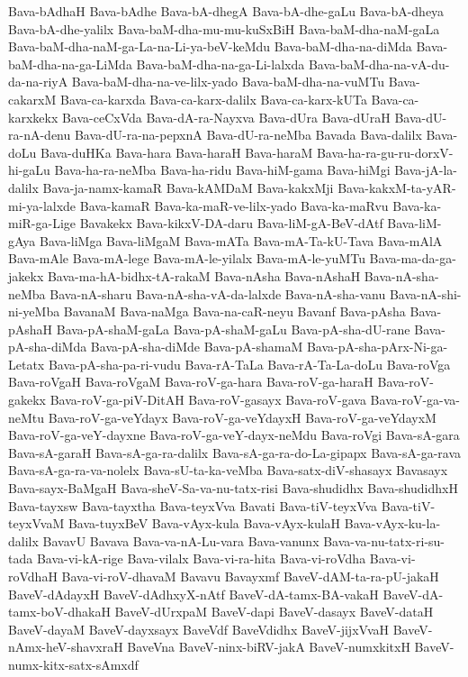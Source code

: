 {Bava-bAdhaH
Bava-bAdhe
Bava-bA-dhegA
Bava-bA-dhe-gaLu
Bava-bA-dheya
Bava-bA-dhe-yalilx
Bava-baM-dha-mu-mu-kuSxBiH
Bava-baM-dha-naM-gaLa
Bava-baM-dha-naM-ga-La-na-Li-ya-beV-keMdu
Bava-baM-dha-na-diMda
Bava-baM-dha-na-ga-LiMda
Bava-baM-dha-na-ga-Li-lalxda
Bava-baM-dha-na-vA-du-da-na-riyA
Bava-baM-dha-na-ve-lilx-yado
Bava-baM-dha-na-vuMTu
Bava-cakarxM
Bava-ca-karxda
Bava-ca-karx-dalilx
Bava-ca-karx-kUTa
Bava-ca-karxkekx
Bava-ceCxVda
Bava-dA-ra-Nayxva
Bava-dUra
Bava-dUraH
Bava-dU-ra-nA-denu
Bava-dU-ra-na-pepxnA
Bava-dU-ra-neMba
Bavada
Bava-dalilx
Bava-doLu
Bava-duHKa
Bava-hara
Bava-haraH
Bava-haraM
Bava-ha-ra-gu-ru-dorxV-hi-gaLu
Bava-ha-ra-neMba
Bava-ha-ridu
Bava-hiM-gama
Bava-hiMgi
Bava-jA-la-dalilx
Bava-ja-namx-kamaR
Bava-kAMDaM
Bava-kakxMji
Bava-kakxM-ta-yAR-mi-ya-lalxde
Bava-kamaR
Bava-ka-maR-ve-lilx-yado
Bava-ka-maRvu
Bava-ka-miR-ga-Lige
Bavakekx
Bava-kikxV-DA-daru
Bava-liM-gA-BeV-dAtf
Bava-liM-gAya
Bava-liMga
Bava-liMgaM
Bava-mATa
Bava-mA-Ta-kU-Tava
Bava-mAlA
Bava-mAle
Bava-mA-lege
Bava-mA-le-yilalx
Bava-mA-le-yuMTu
Bava-ma-da-ga-jakekx
Bava-ma-hA-bidhx-tA-rakaM
Bava-nAsha
Bava-nAshaH
Bava-nA-sha-neMba
Bava-nA-sharu
Bava-nA-sha-vA-da-lalxde
Bava-nA-sha-vanu
Bava-nA-shi-ni-yeMba
BavanaM
Bava-naMga
Bava-na-caR-neyu
Bavanf
Bava-pAsha
Bava-pAshaH
Bava-pA-shaM-gaLa
Bava-pA-shaM-gaLu
Bava-pA-sha-dU-rane
Bava-pA-sha-diMda
Bava-pA-sha-diMde
Bava-pA-shamaM
Bava-pA-sha-pArx-Ni-ga-Letatx
Bava-pA-sha-pa-ri-vudu
Bava-rA-TaLa
Bava-rA-Ta-La-doLu
Bava-roVga
Bava-roVgaH
Bava-roVgaM
Bava-roV-ga-hara
Bava-roV-ga-haraH
Bava-roV-gakekx
Bava-roV-ga-piV-DitAH
Bava-roV-gasayx
Bava-roV-gava
Bava-roV-ga-va-neMtu
Bava-roV-ga-veYdayx
Bava-roV-ga-veYdayxH
Bava-roV-ga-veYdayxM
Bava-roV-ga-veY-dayxne
Bava-roV-ga-veY-dayx-neMdu
Bava-roVgi
Bava-sA-gara
Bava-sA-garaH
Bava-sA-ga-ra-dalilx
Bava-sA-ga-ra-do-La-gipapx
Bava-sA-ga-rava
Bava-sA-ga-ra-va-nolelx
Bava-sU-ta-ka-veMba
Bava-satx-diV-shasayx
Bavasayx
Bava-sayx-BaMgaH
Bava-sheV-Sa-va-nu-tatx-risi
Bava-shudidhx
Bava-shudidhxH
Bava-tayxsw
Bava-tayxtha
Bava-teyxVva
Bavati
Bava-tiV-teyxVva
Bava-tiV-teyxVvaM
Bava-tuyxBeV
Bava-vAyx-kula
Bava-vAyx-kulaH
Bava-vAyx-ku-la-dalilx
BavavU
Bavava
Bava-va-nA-Lu-vara
Bava-vanunx
Bava-va-nu-tatx-ri-su-tada
Bava-vi-kA-rige
Bava-vilalx
Bava-vi-ra-hita
Bava-vi-roVdha
Bava-vi-roVdhaH
Bava-vi-roV-dhavaM
Bavavu
Bavayxmf
BaveV-dAM-ta-ra-pU-jakaH
BaveV-dAdayxH
BaveV-dAdhxyX-nAtf
BaveV-dA-tamx-BA-vakaH
BaveV-dA-tamx-boV-dhakaH
BaveV-dUrxpaM
BaveV-dapi
BaveV-dasayx
BaveV-dataH
BaveV-dayaM
BaveV-dayxsayx
BaveVdf
BaveVdidhx
BaveV-jijxVvaH
BaveV-nAmx-heV-shavxraH
BaveVna
BaveV-ninx-biRV-jakA
BaveV-numxkitxH
BaveV-numx-kitx-satx-sAmxdf
}
